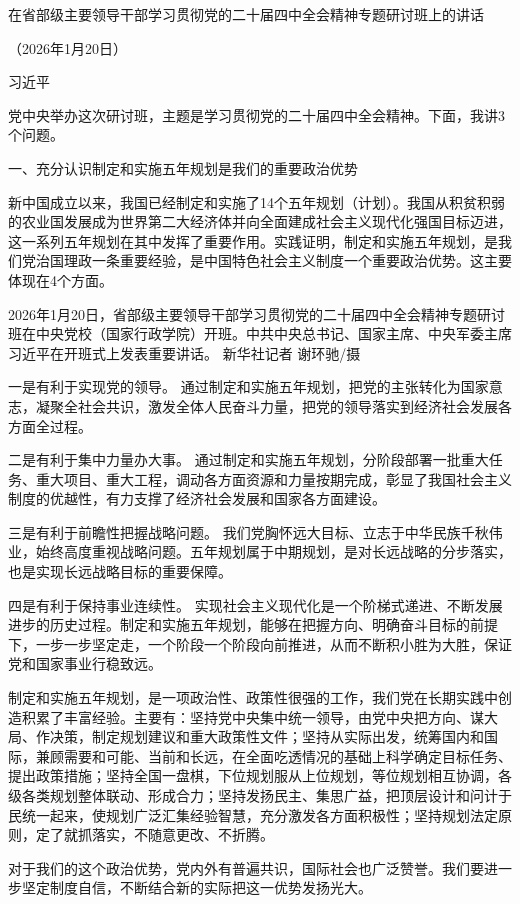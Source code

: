 \documentclass[UTF8,zihao=-4]{ctexart}
\begin{document}
在省部级主要领导干部学习贯彻党的二十届四中全会精神专题研讨班上的讲话

（2026年1月20日）

习近平

党中央举办这次研讨班，主题是学习贯彻党的二十届四中全会精神。下面，我讲3个问题。

一、充分认识制定和实施五年规划是我们的重要政治优势

新中国成立以来，我国已经制定和实施了14个五年规划（计划）。我国从积贫积弱的农业国发展成为世界第二大经济体并向全面建成社会主义现代化强国目标迈进，这一系列五年规划在其中发挥了重要作用。实践证明，制定和实施五年规划，是我们党治国理政一条重要经验，是中国特色社会主义制度一个重要政治优势。这主要体现在4个方面。

2026年1月20日，省部级主要领导干部学习贯彻党的二十届四中全会精神专题研讨班在中央党校（国家行政学院）开班。中共中央总书记、国家主席、中央军委主席习近平在开班式上发表重要讲话。 新华社记者 谢环驰/摄

一是有利于实现党的领导。 通过制定和实施五年规划，把党的主张转化为国家意志，凝聚全社会共识，激发全体人民奋斗力量，把党的领导落实到经济社会发展各方面全过程。

二是有利于集中力量办大事。 通过制定和实施五年规划，分阶段部署一批重大任务、重大项目、重大工程，调动各方面资源和力量按期完成，彰显了我国社会主义制度的优越性，有力支撑了经济社会发展和国家各方面建设。

三是有利于前瞻性把握战略问题。 我们党胸怀远大目标、立志于中华民族千秋伟业，始终高度重视战略问题。五年规划属于中期规划，是对长远战略的分步落实，也是实现长远战略目标的重要保障。

四是有利于保持事业连续性。 实现社会主义现代化是一个阶梯式递进、不断发展进步的历史过程。制定和实施五年规划，能够在把握方向、明确奋斗目标的前提下，一步一步坚定走，一个阶段一个阶段向前推进，从而不断积小胜为大胜，保证党和国家事业行稳致远。

制定和实施五年规划，是一项政治性、政策性很强的工作，我们党在长期实践中创造积累了丰富经验。主要有：坚持党中央集中统一领导，由党中央把方向、谋大局、作决策，制定规划建议和重大政策性文件；坚持从实际出发，统筹国内和国际，兼顾需要和可能、当前和长远，在全面吃透情况的基础上科学确定目标任务、提出政策措施；坚持全国一盘棋，下位规划服从上位规划，等位规划相互协调，各级各类规划整体联动、形成合力；坚持发扬民主、集思广益，把顶层设计和问计于民统一起来，使规划广泛汇集经验智慧，充分激发各方面积极性；坚持规划法定原则，定了就抓落实，不随意更改、不折腾。

对于我们的这个政治优势，党内外有普遍共识，国际社会也广泛赞誉。我们要进一步坚定制度自信，不断结合新的实际把这一优势发扬光大。
\end{document}
